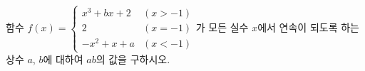 함수 $f(x)=\begin{cases} x^3+bx+2 & (x>-1) \\ 2 & (x=-1) \\ -x^2+x+a & (x<-1) \end{cases}$가 모든 실수 $x$에서 연속이 되도록 하는 상수 $a$, $b$에 대하여 $ab$의 값을 구하시오.
